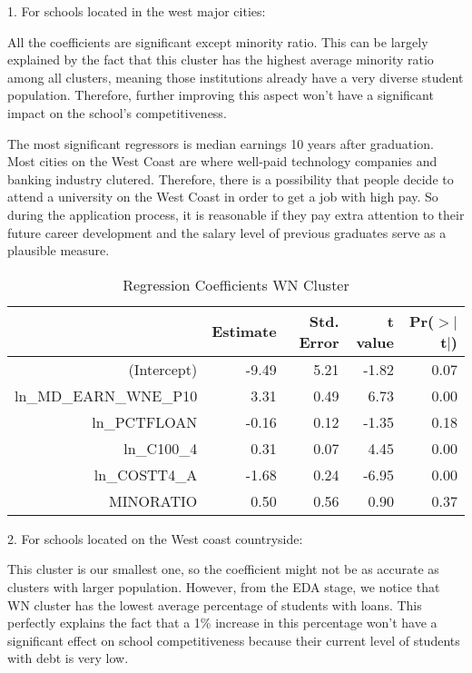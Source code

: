 \documentclass{article}
\begin{document}
1. For schools located in the west major cities:

All the coefficients are significant except minority ratio. This can be largely explained by the fact that this cluster has the highest average minority ratio among all clusters, meaning those institutions already have a very diverse student population. Therefore, further improving this aspect won't have a significant impact on the school's competitiveness.

The most significant regressors is median earnings 10 years after graduation. Most cities on the West Coast are where well-paid technology companies and banking industry clutered. Therefore, there is a possibility that people decide to attend a university on the West Coast in order to get a job with high pay. So during the application process, it is reasonable if they pay extra attention to their future career development and the salary level of previous graduates serve as a plausible measure.

\begin{Schunk}
\begin{Soutput}
\begin{table}[H]
\centering
\begin{tabular}{rrrrr}
  \hline
 & Estimate & Std. Error & t value & Pr($>$$|$t$|$) \\ 
  \hline
(Intercept) & -9.49 & 5.21 & -1.82 & 0.07 \\ 
  ln\_MD\_EARN\_WNE\_P10 & 3.31 & 0.49 & 6.73 & 0.00 \\ 
  ln\_PCTFLOAN & -0.16 & 0.12 & -1.35 & 0.18 \\ 
  ln\_C100\_4 & 0.31 & 0.07 & 4.45 & 0.00 \\ 
  ln\_COSTT4\_A & -1.68 & 0.24 & -6.95 & 0.00 \\ 
  MINORATIO & 0.50 & 0.56 & 0.90 & 0.37 \\ 
   \hline
\end{tabular}
\caption{Regression Coefficients WN Cluster} 
\end{table}
\end{Soutput}
\end{Schunk}

2. For schools located on the West coast countryside:

This cluster is our smallest one, so the coefficient might not be as accurate as clusters with larger population. However, from the EDA stage, we notice that WN cluster has the lowest average percentage of students with loans. This perfectly explains the fact that a 1\% increase in this percentage won't have a significant effect on school competitiveness because their current level of students with debt is very low.
\end{document}
